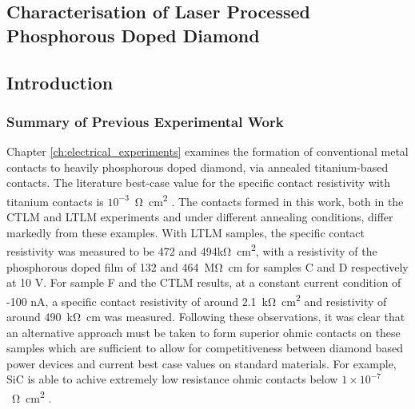 \begin{refsection}
\chapter{Characterisation of Laser Processed Phosphorous Doped Diamond}
\section{Introduction}
\subsection{Summary of Previous Experimental Work}
Chapter \ref{ch:electrical_experiments} examines the formation of conventional metal contacts to heavily phosphorous doped diamond, via annealed titanium-based contacts. The literature best-case value for the specific contact resistivity with titanium contacts is $10^{-3}$~\si{\ohm\centi\metre\squared} \cite{matsumoto2013}. The contacts formed in this work, both in the CTLM and LTLM experiments and under different annealing conditions, differ markedly from these examples. With LTLM samples, the specific contact resistivity was measured to be 472 and 494\si{\kilo\ohm\centi\metre\squared}, with a resistivity of the phosphorous doped film of 132 and 464~\si{\mega\ohm\centi\metre} for samples C and D respectively at 10 V. For sample F and the CTLM results, at a constant current condition of -100 \si{\nano\ampere}, a specific contact resistivity of around 2.1~\si{\kilo\ohm\centi\metre\squared} and resistivity of around 490~\si{\kilo\ohm\centi\metre} was measured. Following these observations, it was clear that an alternative approach must be taken to form superior ohmic contacts on these samples which are sufficient to allow for competitiveness between diamond based power devices and current best case values on standard materials. For example, SiC is able to achive extremely low resistance ohmic contacts below $1\times10^{-7}$~\si{\ohm\centi\metre\squared} \cite{pan2013}.


\end{refsection}

